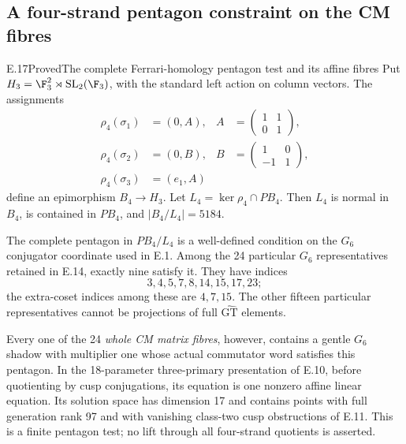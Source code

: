 \subsection{A four-strand pentagon constraint on the CM fibres}

\begin{statement}{E.17}{Proved}{The complete Ferrari-homology pentagon test and its affine fibres}
Put $H_3=\F_3^2\rtimes\mathrm{SL}_2(\F_3)$, with the
standard left action on column vectors. The assignments
\[
 \begin{aligned}
 \rho_4(\sigma_1)&=(0,A),&
 A&=\begin{pmatrix}1&1\\0&1\end{pmatrix},\\
 \rho_4(\sigma_2)&=(0,B),&
 B&=\begin{pmatrix}1&0\\-1&1\end{pmatrix},\\
 \rho_4(\sigma_3)&=(e_1,A)
 \end{aligned}
 \tag{E.17.1}
\]
define an epimorphism $B_4\to H_3$.
Let $L_4=\ker\rho_4\cap PB_4$. Then $L_4$ is normal
in $B_4$, is contained in $PB_4$, and
$|B_4/L_4|=5184$.

The complete pentagon in $PB_4/L_4$ is a well-defined
condition on the $G_6$ conjugator coordinate used in E.1.
Among the 24 particular $G_6$ representatives retained
in E.14, exactly nine satisfy it. They have indices
\[
             3,4,5,7,8,14,15,17,23;
 \tag{E.17.2}
\]
the extra-coset indices among these are $4,7,15$.
The other fifteen particular representatives cannot
be projections of full $\widehat{\mathrm{GT}}$ elements.

Every one of the 24 \emph{whole CM matrix fibres}, however,
contains a gentle $G_6$ shadow with multiplier one
whose actual commutator word satisfies this pentagon.
In the 18-parameter three-primary presentation of E.10,
before quotienting by cusp conjugations, its equation
is one nonzero affine linear equation. Its solution
space has dimension 17 and contains points with full
generation rank 97 and with vanishing class-two cusp
obstructions of E.11. This is a finite pentagon test;
no lift through all four-strand quotients is asserted.
\end{statement}
